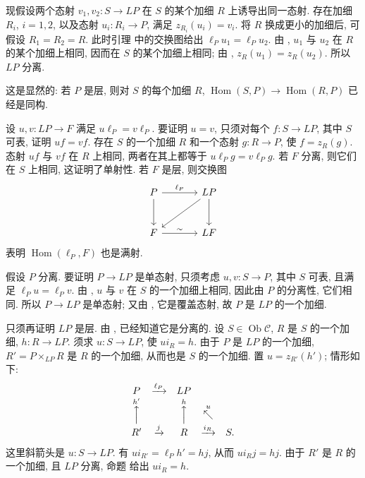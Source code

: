 现假设两个态射 \(v_1,v_2:S\to LP\) 在 \(S\) 的某个加细 \(R\)
上诱导出同一态射. 存在加细 \(R_i\), \(i=1,2\),
以及态射 \(u_i:R_i\to P\), 满足 \(z_{R_i}(u_i)=v_i\).
将 \(R\) 换成更小的加细后, 可假设 \(R_1=R_2=R\).
此时引理 
中的交换图给出 \(\ell_Pu_1=\ell_Pu_2\).
由 ,
\(u_1\) 与 \(u_2\) 在 \(R\) 的某个加细上相同,
因而在 \(S\) 的某个加细上相同;
由 ,
\(z_R(u_1)=z_R(u_2)\). 所以 \(LP\) 分离.

 这是显然的:
若 \(P\) 是层, 则对 \(S\) 的每个加细 \(R\),
\(\operatorname{Hom}(S,P)\to\operatorname{Hom}(R,P)\) 已经是同构.

 设
\(u,v:LP\to F\) 满足 \(u\ell_P=v\ell_P\).
要证明 \(u=v\), 只须对每个 \(f:S\to LP\), 其中 \(S\) 可表,
证明 \(uf=vf\). 存在 \(S\) 的一个加细 \(R\) 和一个态射
\(g:R\to P\), 使 \(f=z_R(g)\).
态射 \(uf\) 与 \(vf\) 在 \(R\) 上相同,
两者在其上都等于 \(u\ell_Pg=v\ell_Pg\).
若 \(F\) 分离, 则它们在 \(S\) 上相同, 这证明了单射性.
若 \(F\) 是层, 则交换图
\[
\begin{tikzcd}[column sep=large,row sep=large]
 P \arrow[r,"\ell_P"] \arrow[d] &
 LP \arrow[d] \arrow[dl]\\
 F \arrow[r,"\sim"] & LF
\end{tikzcd}
\]
表明 \(\operatorname{Hom}(\ell_P,F)\) 也是满射.

 假设 \(P\) 分离.
要证明 \(P\to LP\) 是单态射, 只须考虑 \(u,v:S\to P\),
其中 \(S\) 可表, 且满足 \(\ell_Pu=\ell_Pv\).
由 ,
\(u\) 与 \(v\) 在 \(S\) 的一个加细上相同,
因此由 \(P\) 的分离性, 它们相同.
所以 \(P\to LP\) 是单态射; 又由
, 它是覆盖态射,
故 \(P\) 是 \(LP\) 的一个加细.

只须再证明 \(LP\) 是层. 由 ,
已经知道它是分离的. 设 \(S\in\operatorname{Ob}\mathscr C\),
\(R\) 是 \(S\) 的一个加细, \(h:R\to LP\).
须求 \(u:S\to LP\), 使 \(ui_R=h\).
由于 \(P\) 是 \(LP\) 的一个加细,
\(R'=P\times_{LP}R\) 是 \(R\) 的一个加细, 从而也是 \(S\) 的一个加细.
置 \(u=z_{R'}(h')\); 情形如下:
\[
\begin{array}{ccccc}
 P&\xrightarrow{\ell_P}&LP&&\\
 \overset{h'}{\Big\uparrow}&&
 \overset{h}{\Big\uparrow}&\overset{u}{\nwarrow}&\\
 R'&\xrightarrow{j}&R&\xrightarrow{i_R}&S.
\end{array}
\]
这里斜箭头是 \(u:S\to LP\).
有 \(ui_{R'}=\ell_Ph'=hj\), 从而 \(ui_Rj=hj\).
由于 \(R'\) 是 \(R\) 的一个加细, 且 \(LP\) 分离,
命题  给出 \(ui_R=h\).

